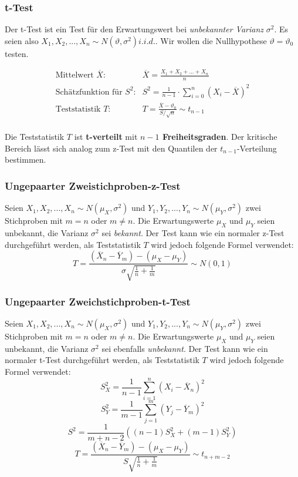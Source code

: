 \documentclass[10pt,a4paper,twocolumn]{article}
\begin{document}
\subsubsection{t-Test}
Der t-Test ist ein Test für den Erwartungswert bei \emph{unbekannter Varianz} $\sigma^2$. Es seien also $X_1,X_2,...,X_n \sim N(\vartheta,\sigma^2) i.i.d.$. Wir wollen die Nullhypothese $\vartheta=\vartheta_0$ testen.

\[
\begin{array}{ll}
	\text{Mittelwert $\overline{X}$:} & \overline{X}=\frac{X_1+X_2+...+X_n}{n} \\
	\text{Schätzfunktion für $S^2$:} & S^2 = \frac{1}{n-1}\cdot \sum\limits_{i=0}^{n}(X_i - \overline{X})^2 \\
	\text{Teststatistik $T$:} & T = \frac{\overline{X}-\vartheta_0}{S/\sqrt{n}}\sim t_{n-1} \\
\end{array}
\]

Die Teststatistik $T$ ist \textbf{t-verteilt} mit \textbf{$n-1$ Freiheitsgraden}. Der kritische Bereich lässt sich analog zum z-Test mit den Quantilen der $t_{n-1}$-Verteilung bestimmen.

\subsubsection{Ungepaarter Zweistichproben-z-Test}
Seien $X_1,X_2,...,X_n \sim N(\mu_X,\sigma^2)$ und $Y_1,Y_2,...,Y_n \sim N(\mu_Y,\sigma^2)$ zwei Stichproben mit $m = n$ oder $m \neq n$. Die Erwartungswerte $\mu_X$ und $\mu_Y$ seien unbekannt, die Varianz $\sigma^2$ sei \emph{bekannt}. Der Test kann wie ein normaler z-Test durchgeführt werden, als Teststatistik $T$ wird jedoch folgende Formel verwendet:
\[
T = \frac{\left(\overline{X}_n-\overline{Y}_m\right)-\left(\mu_X-\mu_Y\right)}{\sigma\sqrt{\frac{1}{n}+\frac{1}{m}}}\sim N(0,1)
\]

\subsubsection{Ungepaarter Zweichstichproben-t-Test}
Seien $X_1,X_2,...,X_n \sim N(\mu_X,\sigma^2)$ und $Y_1,Y_2,...,Y_n \sim N(\mu_Y,\sigma^2)$ zwei Stichproben mit $m = n$ oder $m \neq n$. Die Erwartungswerte $\mu_X$ und $\mu_Y$ seien unbekannt, die Varianz $\sigma^2$ sei ebenfalls \emph{unbekannt}. Der Test kann wie ein normaler t-Test durchgeführt werden, als Teststatistik $T$ wird jedoch folgende Formel verwendet:
\[
S_{X}^{2}=\frac{1}{n-1}\sum\limits_{i=1}^{n}\left(X_i-\overline{X}_n\right)^2
\]
\[
S_{Y}^{2}=\frac{1}{m-1}\sum\limits_{j=1}^{m}\left(Y_j-\overline{Y}_m\right)^2
\]
\[
S^2=\frac{1}{m+n-2}\left((n-1)S_{X}^{2}+(m-1)S_{Y}^{2}\right)
\]
\[
T = \frac{\left(\overline{X}_n-\overline{Y}_m\right)-\left(\mu_X-\mu_Y\right)}{S\sqrt{\frac{1}{n}+\frac{1}{m}}}\sim t_{n+m-2}
\]
\end{document}
